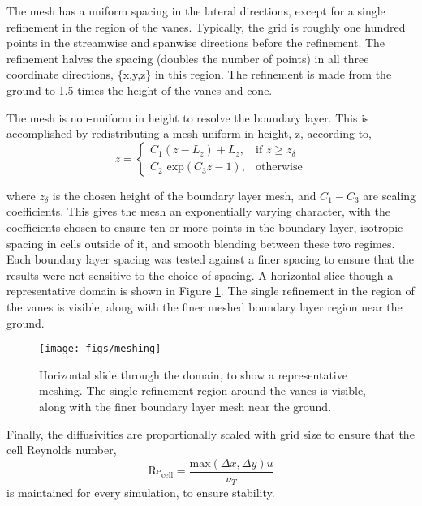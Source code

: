 The mesh has a uniform spacing in the lateral directions, except for a
single refinement in the region of the vanes. Typically, the grid is 
roughly one hundred points in the streamwise and spanwise directions
before the refinement. The refinement halves the spacing (doubles the
number of points) in all three
coordinate directions, \{x,y,z\} in this region. The refinement is made
from the ground to 1.5 times the height of the vanes and cone. 

The mesh is non-uniform in height to
resolve the boundary layer. This is accomplished by redistributing a
mesh uniform in height, z, according to,
\begin{equation}
 z = \begin{cases} C_1(z-L_z)+L_z,& \text{if } z \geq z_\delta\\
      C_2 \text{ exp}(C_3 z - 1),                 & \text{otherwise}
     \end{cases}
\end{equation}

where $z_\delta$ is the chosen height of the boundary layer mesh, and
$C_1-C_3$ are scaling coefficients. 
This gives the mesh an exponentially
varying character, with the coefficients chosen to ensure ten or more
points in the boundary layer, isotropic spacing in cells outside of
it, and smooth blending between these two regimes. Each boundary layer
spacing was tested against a finer spacing to ensure that the results
were not sensitive to the choice of spacing. A horizontal slice though a
representative domain is shown in Figure \ref{fig:meshing}. The single
refinement in the region of the vanes is visible, along with the finer
meshed boundary layer region near the ground. 

  \begin{figure}[!htb]
    \begin{center}
     \texttt{[image: figs/meshing]}
     \caption{Horizontal slide through the domain, to show a
     representative meshing. The single refinement region around the
     vanes is visible, along with the finer boundary layer mesh near the
     ground.}
     \label{fig:meshing}
    \end{center}
  \end{figure}

Finally, the diffusivities are proportionally
scaled with grid size to ensure that the cell Reynolds number, 
\begin{equation}
 \text{Re}_\text{cell} = \frac{\text{max}(\Delta x,\Delta y) u}{\nu_T}
\end{equation}
 is maintained for every simulation, to ensure stability.


